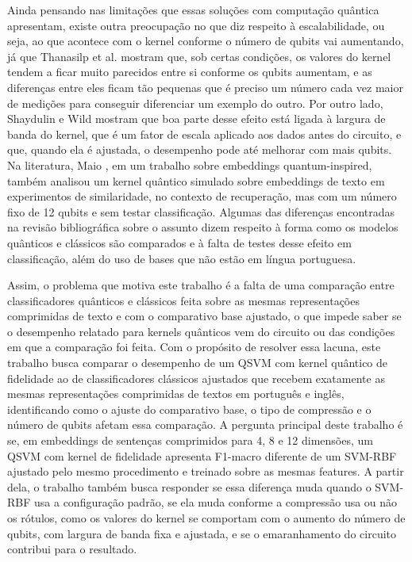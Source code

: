 \documentclass[conference]{IEEEtran}
\newcommand{\svm}{\mbox{SVM-RBF}}
\begin{document}
Ainda pensando nas limitações que essas soluções com computação quântica apresentam, existe outra preocupação no que diz respeito à escalabilidade, ou seja, ao que acontece com o kernel conforme o número de qubits vai aumentando, já que Thanasilp et al. \cite{thanasilp2024} mostram que, sob certas condições, os valores do kernel tendem a ficar muito parecidos entre si conforme os qubits aumentam, e as diferenças entre eles ficam tão pequenas que é preciso um número cada vez maior de medições para conseguir diferenciar um exemplo do outro. Por outro lado, Shaydulin e Wild \cite{shaydulin2021} mostram que boa parte desse efeito está ligada à largura de banda do kernel, que é um fator de escala aplicado aos dados antes do circuito, e que, quando ela é ajustada, o desempenho pode até melhorar com mais qubits. Na literatura, Maio \cite{maio2026}, em um trabalho sobre embeddings quantum-inspired, também analisou um kernel quântico simulado sobre embeddings de texto em experimentos de similaridade, no contexto de recuperação, mas com um número fixo de 12 qubits e sem testar classificação. Algumas das diferenças encontradas na revisão bibliográfica sobre o assunto dizem respeito à forma como os modelos quânticos e clássicos são comparados e à falta de testes desse efeito em classificação, além do uso de bases que não estão em língua portuguesa.

Assim, o problema que motiva este trabalho é a falta de uma comparação entre classificadores quânticos e clássicos feita sobre as mesmas representações comprimidas de texto e com o comparativo base ajustado, o que impede saber se o desempenho relatado para kernels quânticos vem do circuito ou das condições em que a comparação foi feita. Com o propósito de resolver essa lacuna, este trabalho busca comparar o desempenho de um QSVM com kernel quântico de fidelidade ao de classificadores clássicos ajustados que recebem exatamente as mesmas representações comprimidas de textos em português e inglês, identificando como o ajuste do comparativo base, o tipo de compressão e o número de qubits afetam essa comparação. A pergunta principal deste trabalho é se, em embeddings de sentenças comprimidos para 4, 8 e 12 dimensões, um QSVM com kernel de fidelidade apresenta F1-macro diferente de um \svm{} ajustado pelo mesmo procedimento e treinado sobre as mesmas features. A partir dela, o trabalho também busca responder se essa diferença muda quando o \svm{} usa a configuração padrão, se ela muda conforme a compressão usa ou não os rótulos, como os valores do kernel se comportam com o aumento do número de qubits, com largura de banda fixa e ajustada, e se o emaranhamento do circuito contribui para o resultado.
\end{document}
